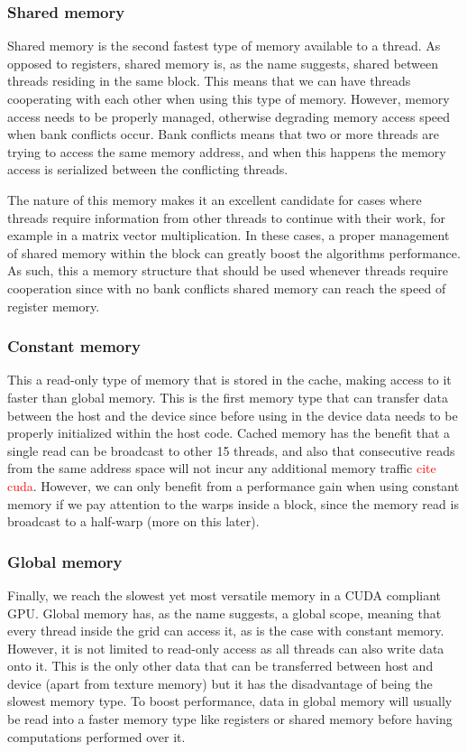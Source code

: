 \documentclass[12pt]{book}
\begin{document}
\subsubsection{Shared memory} 
Shared memory is the second fastest type of memory available to a thread. As opposed to registers, shared memory is, as the name suggests, shared between threads residing in the same block. This means that we can have threads cooperating with each other when using this type of memory. However, memory access needs to be properly managed, otherwise degrading memory access speed when bank conflicts occur. Bank conflicts means that two or more threads are trying to access the same memory address, and when this happens the memory access is serialized between the conflicting threads.\par
The nature of this memory makes it an excellent candidate for cases where threads require information from other threads to continue with their work, for example in a matrix vector multiplication. In these cases, a proper management of shared memory within the block can greatly boost the algorithms performance. As such, this a memory structure that should be used whenever threads require cooperation since with no bank conflicts shared memory can reach the speed of register memory.
\subsubsection{Constant memory}
This a read-only type of memory that is stored in the cache, making access to it faster than global memory. This is the first memory type that can transfer data between the host and the device since before using in the device data needs to be properly initialized within the host code. Cached memory has the benefit that a single read can be broadcast to other 15 threads, and also that consecutive reads from the same address space will not incur any additional memory traffic \textcolor{red}{cite cuda}. However, we can only benefit from a performance gain when using constant memory if we pay attention to the warps inside a block, since the memory read is broadcast to a half-warp (more on this later).
\subsubsection{Global memory}
Finally, we reach the slowest yet most versatile memory in a CUDA compliant GPU. Global memory has, as the name suggests, a global scope, meaning that every thread inside the grid can access it, as is the case with constant memory. However, it is not limited to read-only access as all threads can also write data onto it. This is the only other data that can be transferred between host and device (apart from texture memory) but it has the disadvantage of being the slowest memory type. To boost performance, data in global memory will usually be read into a faster memory type like registers or shared memory before having computations performed over it.
\end{document}
